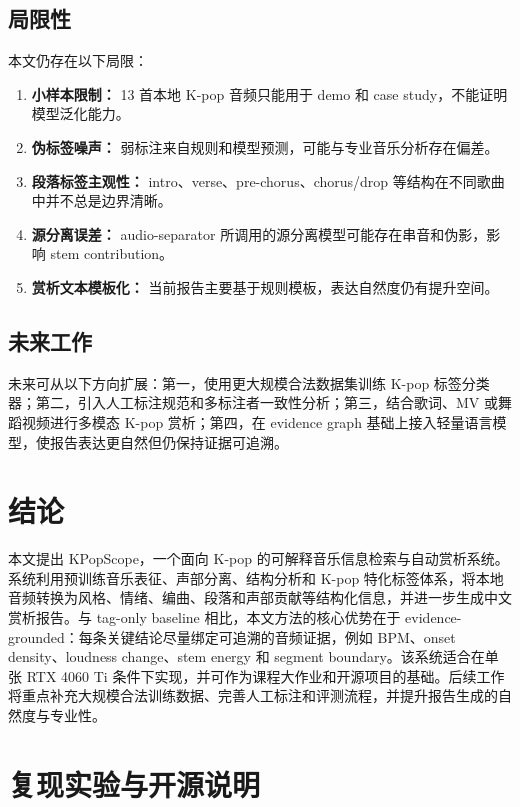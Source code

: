 \documentclass[UTF8,zihao=-4]{ctexart}
\newcommand{\method}{KPopScope}
\begin{document}
\subsection{局限性}

本文仍存在以下局限：

\begin{enumerate}[leftmargin=2em]
    \item \textbf{小样本限制：} 13 首本地 K-pop 音频只能用于 demo 和 case study，不能证明模型泛化能力。
    \item \textbf{伪标签噪声：} 弱标注来自规则和模型预测，可能与专业音乐分析存在偏差。
    \item \textbf{段落标签主观性：} intro、verse、pre-chorus、chorus/drop 等结构在不同歌曲中并不总是边界清晰。
    \item \textbf{源分离误差：} audio-separator 所调用的源分离模型可能存在串音和伪影，影响 stem contribution。
    \item \textbf{赏析文本模板化：} 当前报告主要基于规则模板，表达自然度仍有提升空间。
\end{enumerate}

\subsection{未来工作}

未来可从以下方向扩展：第一，使用更大规模合法数据集训练 K-pop 标签分类器；第二，引入人工标注规范和多标注者一致性分析；第三，结合歌词、MV 或舞蹈视频进行多模态 K-pop 赏析；第四，在 evidence graph 基础上接入轻量语言模型，使报告表达更自然但仍保持证据可追溯。

\section{结论}

本文提出 \method{}，一个面向 K-pop 的可解释音乐信息检索与自动赏析系统。系统利用预训练音乐表征、声部分离、结构分析和 K-pop 特化标签体系，将本地音频转换为风格、情绪、编曲、段落和声部贡献等结构化信息，并进一步生成中文赏析报告。与 tag-only baseline 相比，本文方法的核心优势在于 evidence-grounded：每条关键结论尽量绑定可追溯的音频证据，例如 BPM、onset density、loudness change、stem energy 和 segment boundary。该系统适合在单张 RTX 4060 Ti 条件下实现，并可作为课程大作业和开源项目的基础。后续工作将重点补充大规模合法训练数据、完善人工标注和评测流程，并提升报告生成的自然度与专业性。

\section*{复现实验与开源说明}
\end{document}

